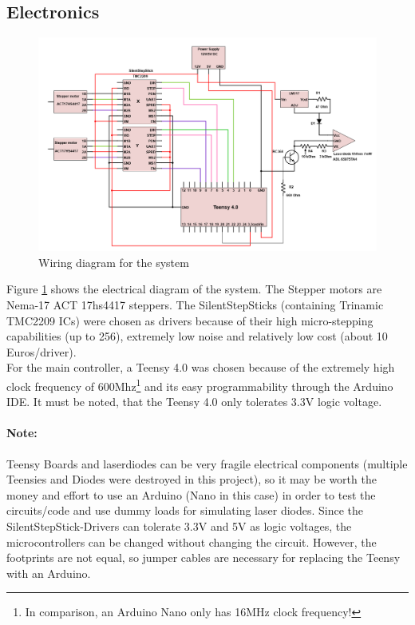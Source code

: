 \documentclass[a4paper, 11pt]{scrartcl}
\begin{document}
\subsection{Electronics}
\begin{figure}[H]
\begin{center}
\includegraphics[width=15cm]{img/electronics.png}
\caption{Wiring diagram for the system} %
\label{electronics}
\end{center}
\end{figure}
Figure \ref{electronics} shows the electrical diagram of the system. The Stepper motors are Nema-17 ACT 17hs4417 steppers. The SilentStepSticks (containing Trinamic TMC2209 ICs)  were chosen as drivers because of their high micro-stepping capabilities (up to 256), extremely low noise and relatively low cost (about 10 Euros/driver). \\
For the main controller, a Teensy 4.0 was chosen because of the extremely high clock frequency of 600Mhz\footnote{In comparison, an Arduino Nano only has 16MHz clock frequency!} and its easy programmability through the Arduino IDE. It must be noted, that the Teensy 4.0 only tolerates 3.3V logic voltage. 

\paragraph{Note:} Teensy Boards and laserdiodes can be very fragile electrical components (multiple Teensies and Diodes were destroyed in this project), so it may be worth the money and effort to use an Arduino (Nano in this case) in order to test the circuits/code and use dummy loads for simulating laser diodes. Since the SilentStepStick-Drivers can tolerate 3.3V and 5V as logic voltages, the microcontrollers can be changed without changing the circuit. However, the footprints are not equal, so jumper cables are necessary for replacing the Teensy with an Arduino. \\
\end{document}
